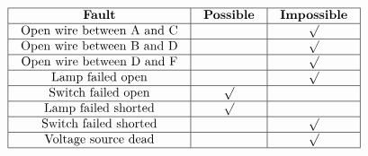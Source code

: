 \vfil 

\eject







$$\vbox{\offinterlineskip
\halign{\strut
\vrule \quad\hfil # \ \hfil & 
\vrule \quad\hfil # \ \hfil & 
\vrule \quad\hfil # \ \hfil \vrule \cr
\noalign{\hrule}
%
{\bf Fault} & {\bf Possible} & {\bf Impossible} \cr
%
\noalign{\hrule}
%
Open wire between A and C &  & $\surd$ \cr
%
\noalign{\hrule}
%
Open wire between B and D &  & $\surd$ \cr
%
\noalign{\hrule}
%
Open wire between D and F &  & $\surd$ \cr
%
\noalign{\hrule}
%
Lamp failed open &  & $\surd$ \cr
%
\noalign{\hrule}
%
Switch failed open & $\surd$ &  \cr
%
\noalign{\hrule}
%
Lamp failed shorted & $\surd$ &  \cr
%
\noalign{\hrule}
%
Switch failed shorted &  & $\surd$ \cr
%
\noalign{\hrule}
%
Voltage source dead &  & $\surd$ \cr
%
\noalign{\hrule}
} %
}$$ %











